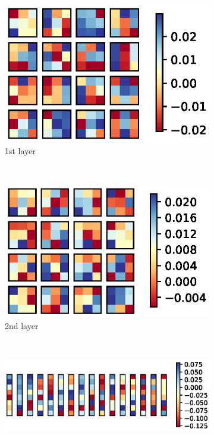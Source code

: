 \documentclass{scrartcl}
\begin{document}
\begin{figure}[htbp]
\centering
\begin{subfigure}[b]{0.4\textwidth}
\centering
\includegraphics[scale=0.82]{figures/conv2d_layer_1.eps}
\caption{1st layer}
\label{fig:1st_layer}
\end{subfigure}
~ %
\begin{subfigure}[b]{0.4\textwidth}
\centering
\includegraphics[scale=0.82]{figures/conv2d_layer_2.eps}
\caption{2nd layer}
\label{fig:2nd_layer}
\end{subfigure}
~ %
\begin{subfigure}[b]{0.9\textwidth}
\centering
\includegraphics[scale=0.82]{figures/conv2d_layer_3.eps}

\end{subfigure}
\end{figure}
\end{document}
